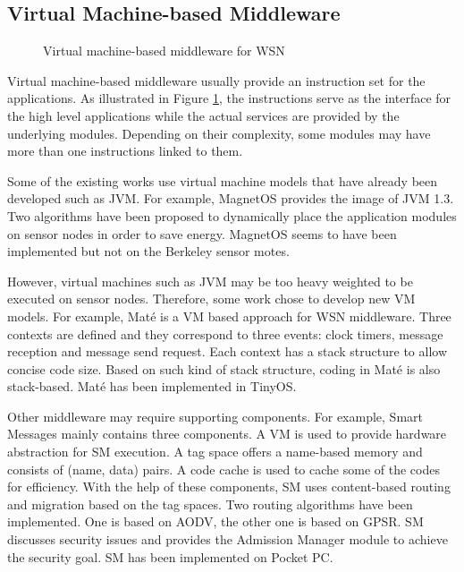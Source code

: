 \subsection{Virtual Machine-based Middleware}

\begin{figure}
\centering
{}
\caption{Virtual machine-based middleware for WSN}
\label{fig:wsn-middleware-vm}
\end{figure}

Virtual machine-based middleware usually provide an instruction set for the applications. As illustrated in Figure \ref{fig:wsn-middleware-vm}, the instructions serve as the interface for the high level applications while the actual services are provided by the underlying modules. Depending on their complexity, some modules may have more than one instructions linked to them.

Some of the existing works use virtual machine models that have already been developed such as JVM. For example, MagnetOS \cite{magnetos} provides the image of JVM 1.3. Two algorithms have been proposed to dynamically place the application modules on sensor nodes in order to save energy. MagnetOS seems to have been implemented but not on the Berkeley sensor motes.

However, virtual machines such as JVM may be too heavy weighted to be executed on sensor nodes. Therefore, some work chose to develop new VM models. For example, Mat\'{e} \cite{mate} is a VM based approach for WSN middleware. Three contexts are defined and they correspond to three events: clock timers, message reception and message send request. Each context has a stack structure to allow concise code size. Based on such kind of stack structure, coding in Mat\'{e} is also stack-based. Mat\'{e} has been implemented in TinyOS.

Other middleware may require supporting components. For example, Smart Messages \cite{smartmessage} mainly contains three components. A VM is used to provide hardware abstraction for SM execution. A tag space offers a name-based memory and consists of (name, data) pairs. A code cache is used to cache some of the codes for efficiency. With the help of these components, SM uses content-based routing and migration based on the tag spaces. Two routing algorithms have been implemented. One is based on AODV, the other one is based on GPSR. SM discusses security issues and provides the Admission Manager module to achieve the security goal. SM has been implemented on Pocket PC.

